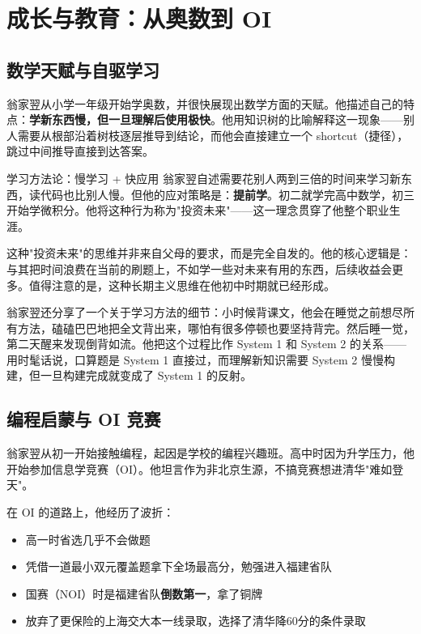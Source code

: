\section{成长与教育：从奥数到 OI}

\subsection{数学天赋与自驱学习}

翁家翌从小学一年级开始学奥数，并很快展现出数学方面的天赋。他描述自己的特点：\textbf{学新东西慢，但一旦理解后使用极快}。他用知识树的比喻解释这一现象——别人需要从根部沿着树枝逐层推导到结论，而他会直接建立一个 shortcut（捷径），跳过中间推导直接到达答案。

\begin{importantbox}{学习方法论：慢学习 + 快应用}
翁家翌自述需要花别人两到三倍的时间来学习新东西，读代码也比别人慢。但他的应对策略是：\textbf{提前学}。初二就学完高中数学，初三开始学微积分。他将这种行为称为"投资未来"——这一理念贯穿了他整个职业生涯。
\end{importantbox}

这种"投资未来"的思维并非来自父母的要求，而是完全自发的。他的核心逻辑是：与其把时间浪费在当前的刷题上，不如学一些对未来有用的东西，后续收益会更多。值得注意的是，这种长期主义思维在他初中时期就已经形成。

翁家翌还分享了一个关于学习方法的细节：小时候背课文，他会在睡觉之前想尽所有方法，磕磕巴巴地把全文背出来，哪怕有很多停顿也要坚持背完。然后睡一觉，第二天醒来发现倒背如流。他把这个过程比作 System 1 和 System 2 的关系——用时髦话说，口算题是 System 1 直接过，而理解新知识需要 System 2 慢慢构建，但一旦构建完成就变成了 System 1 的反射。

\subsection{编程启蒙与 OI 竞赛}

翁家翌从初一开始接触编程，起因是学校的编程兴趣班。高中时因为升学压力，他开始参加信息学竞赛（OI）。他坦言作为非北京生源，不搞竞赛想进清华"难如登天"。

在 OI 的道路上，他经历了波折：
\begin{itemize}
    \item 高一时省选几乎不会做题
    \item 凭借一道最小双元覆盖题拿下全场最高分，勉强进入福建省队
    \item 国赛（NOI）时是福建省队\textbf{倒数第一}，拿了铜牌
    \item 放弃了更保险的上海交大本一线录取，选择了清华降60分的条件录取
\end{itemize}

